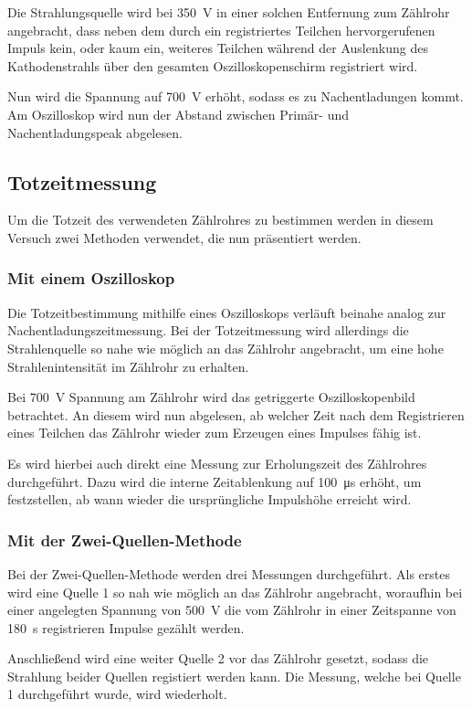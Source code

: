 Die Strahlungsquelle wird bei \SI{350}{\volt} in einer solchen
Entfernung zum Zählrohr angebracht, dass neben dem durch ein
registriertes Teilchen hervorgerufenen Impuls kein, oder kaum ein,
weiteres Teilchen während der Auslenkung des Kathodenstrahls über den
gesamten Oszilloskopenschirm registriert wird.

Nun wird die Spannung auf \SI{700}{\volt} erhöht, sodass es zu
Nachentladungen kommt.  Am Oszilloskop wird nun der Abstand zwischen
Primär- und Nachentladungspeak abgelesen.
%
\subsection{Totzeitmessung}
Um die Totzeit des verwendeten Zählrohres zu bestimmen werden in diesem
Versuch zwei Methoden verwendet, die nun präsentiert werden.
\subsubsection{Mit einem Oszilloskop}
%
Die Totzeitbestimmung mithilfe eines Oszilloskops verläuft beinahe
analog zur Nachentladungszeitmessung. Bei der Totzeitmessung wird
allerdings die Strahlenquelle so nahe wie möglich an das Zählrohr
angebracht, um eine hohe Strahlenintensität im Zählrohr zu erhalten.

Bei \SI{700}{\volt} Spannung am Zählrohr wird das getriggerte
Oszilloskopenbild betrachtet. An diesem wird nun abgelesen, ab welcher
Zeit nach dem Registrieren eines Teilchen das Zählrohr wieder zum
Erzeugen eines Impulses fähig ist.

Es wird hierbei auch direkt eine Messung zur Erholungszeit des
Zählrohres durchgeführt.  Dazu wird die interne Zeitablenkung auf
\SI{100}{\micro\second} erhöht, um festzstellen, ab wann wieder die
ursprüngliche Impulshöhe erreicht wird.
%
\subsubsection{Mit der Zwei-Quellen-Methode}
%
Bei der Zwei-Quellen-Methode werden drei Messungen durchgeführt.  Als
erstes wird eine Quelle 1 so nah wie möglich an das Zählrohr angebracht,
woraufhin bei einer angelegten Spannung von \SI{500}{\volt} die vom
Zählrohr in einer Zeitspanne von \SI{180}{\second} registrieren Impulse
gezählt werden.

Anschließend wird eine weiter Quelle 2 vor das Zählrohr gesetzt, sodass
die Strahlung beider Quellen registiert werden kann. Die Messung, welche
bei Quelle 1 durchgeführt wurde, wird wiederholt.  

